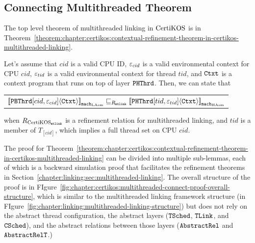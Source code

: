 \subsection{Connecting Multithreaded Theorem}
\label{chapter:certikos:subsec:connecting-multithreaded-theroem}

The top level theorem of
multithreaded linking in $\mathrm{CertiKOS}$  is in Theorem~\ref{theorem:chapter:certikos:contextual-refinement-theorem-in-certikos-multithreaded-linking}.

\begin{theorem}
\label{theorem:chapter:certikos:contextual-refinement-theorem-in-certikos-multithreaded-linking}
Let's assume that $cid$ is a valid CPU ID, ${\varepsilon}_{cid}$ is a valid
environmental context for CPU $cid$, 
${\varepsilon}_{tid}$ is a valid
environmental context for thread $tid$, 
and ${\mathrm{\texttt{Ctxt}}}$ is a
 context program that runs on top of layer ${\mathrm{\texttt{PHThrd}}}$. 
 Then, we can state that
 \begin{center}
\begin{tabular}{c}
${[\![{{\mathrm{\texttt{PBThrd}}}[cid, {\varepsilon}_{cid}]} \langle {{\mathrm{\texttt{Ctxt}}}} \rangle]\!]}_{{\mathrm{\texttt{mach}}}_{\mathrm{LAsm}}} \sqsubseteq_{R_{{\mathrm{\texttt{mtlink}}}}} {[\![{{\mathrm{\texttt{PHThrd}}}[tid, {\varepsilon}_{tid}]} \langle {{\mathrm{\texttt{Ctxt}}}} \rangle]\!]}_{{{\mathrm{\texttt{mach}}}_{\mathrm{HAsm}}}}$\\
\end{tabular}
\end{center}
when ${R_{\mathrm{CertiKOS}_{\mathrm{\texttt{mtlink}}}}}$ is a refinement relation for multithreaded linking, and $tid$ is a member of $T_{[cid]}$,
which implies a full thread set on CPU $cid$.
\end{theorem}


The proof for Theorem~\ref{theorem:chapter:certikos:contextual-refinement-theorem-in-certikos-multithreaded-linking} 
can be divided into multiple sub-lemmas, each of which is a backward simulation proof 
that facilitates the refinement theorems in Section~\ref{chapter:linking:sec:multithreaded-linking}. 
The overall structure of the proof is in FIgure~\ref{fig:chapter:certikos:multithreaded-connect-proof-overall-structure}, which is 
similar to the multithreaded linking framework structure (in FIgure~\ref{fig:chapter:linking:multithreaded-linking-structure}) but does not rely on
the abstract thread configuration, the abstract layers (${{\mathrm{\texttt{TSched}}}}$, ${{\mathrm{\texttt{TLink}}}}$, and ${{\mathrm{\texttt{CSched}}}}$), and 
the abstract relations between those layers (${\mathrm{\texttt{AbstractRel}}}$ and ${\mathrm{\texttt{AbstractRelT}}}$.)
 
